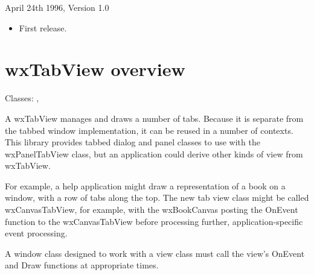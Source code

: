 April 24th 1996, Version 1.0

\begin{itemize}\itemsep=0pt
\item First release.
\end{itemize}

\section{wxTabView overview}\label{wxtabviewoverview}

Classes: , 

A wxTabView manages and draws a number of tabs. Because it is separate
from the tabbed window implementation, it can be reused in a number of contexts.
This library provides tabbed dialog and panel classes to use with the
wxPanelTabView class, but an application could derive other kinds of
view from wxTabView. 

For example, a help application might draw a representation of a book on
a window, with a row of tabs along the top. The new tab view class might
be called wxCanvasTabView, for example, with the wxBookCanvas posting
the OnEvent function to the wxCanvasTabView before processing further,
application-specific event processing. 

A window class designed to work with a view class must call the view's
OnEvent and Draw functions at appropriate times.

